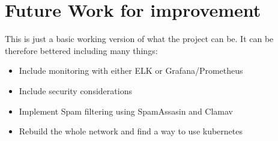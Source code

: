 \documentclass[12pt]{article}
\begin{document}
\section{Future Work for improvement}
This is just a basic working version of what the project can be. It can be therefore bettered including many things:
\begin{itemize}
    \item Include monitoring with either ELK or Grafana/Prometheus
    \item Include security considerations
    \item Implement Spam filtering using SpamAssasin and Clamav
    \item Rebuild the whole network and find a way to use kubernetes
\end{itemize}


\end{document}
